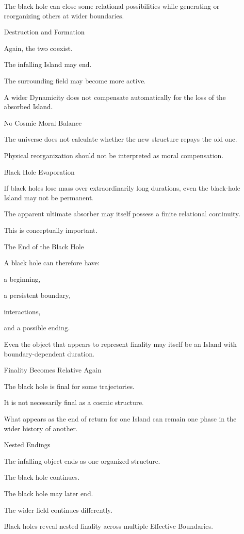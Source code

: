 The black hole can close some relational possibilities while generating or reorganizing others at wider boundaries.

Destruction and Formation

Again, the two coexist.

The infalling Island may end.

The surrounding field may become more active.

A wider Dynamicity does not compensate automatically for the loss of the absorbed Island.

No Cosmic Moral Balance

The universe does not calculate whether the new structure repays the old one.

Physical reorganization should not be interpreted as moral compensation.

Black Hole Evaporation

If black holes lose mass over extraordinarily long durations, even the black-hole Island may not be permanent.

The apparent ultimate absorber may itself possess a finite relational continuity.

This is conceptually important.

The End of the Black Hole

A black hole can therefore have:

a beginning,

a persistent boundary,

interactions,

and a possible ending.

Even the object that appears to represent finality may itself be an Island with boundary-dependent duration.

Finality Becomes Relative Again

The black hole is final for some trajectories.

It is not necessarily final as a cosmic structure.

What appears as the end of return for one Island can remain one phase in the wider history of another.

Nested Endings

The infalling object ends as one organized structure.

The black hole continues.

The black hole may later end.

The wider field continues differently.

Black holes reveal nested finality across multiple Effective Boundaries.

